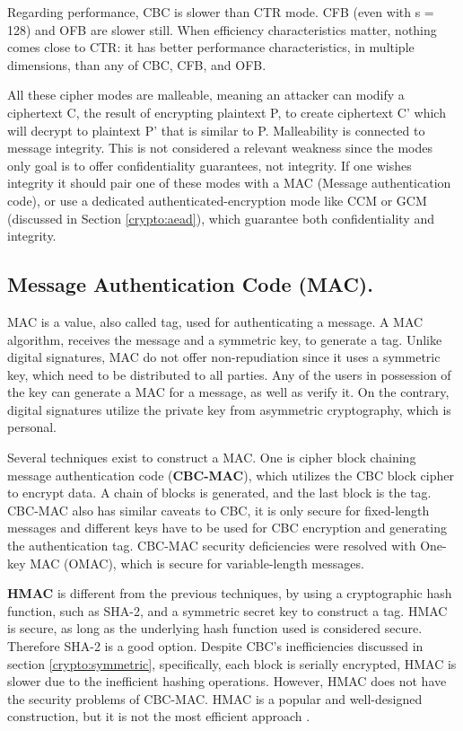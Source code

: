 Regarding performance, CBC is slower than CTR mode. CFB (even with s = 128) and OFB are slower still.
When efficiency characteristics matter, nothing comes close to CTR: it has better performance characteristics, in multiple dimensions, than any of CBC, CFB, and OFB.

All these cipher modes are malleable, meaning an attacker can modify a ciphertext C, the result of encrypting plaintext P, to create ciphertext C' which will decrypt to plaintext P' that is similar to P. Malleability is connected to message integrity. This is not considered a relevant weakness since the modes only goal is to offer confidentiality guarantees, not integrity. If one wishes integrity it should pair one of these modes with a MAC (Message authentication code), or use a dedicated authenticated-encryption mode like CCM or GCM (discussed in Section \ref{crypto:aead}), which guarantee both confidentiality and integrity.

\subsection{Message Authentication Code (MAC).}  \label{crypto:mac}

MAC is a value, also called tag, used for authenticating a message.
A MAC algorithm, receives the message and a symmetric key, to generate a tag. Unlike digital signatures, MAC do not offer non-repudiation since it uses a symmetric key, which need to be distributed to all parties. Any of the users in possession of the key can generate a MAC for a message, as well as verify it. On the contrary, digital signatures utilize the private key from asymmetric cryptography, which is personal.

Several techniques exist to construct a MAC. One is cipher block chaining message authentication code (\textbf{CBC-MAC}), which utilizes the CBC block cipher to encrypt data. A chain of blocks is generated, and the last block is the tag.
CBC-MAC also has similar caveats to CBC, it is only secure for fixed-length messages \cite{aesmodes} and different keys have to be used for CBC encryption and generating the authentication tag. 
CBC-MAC security deficiencies were resolved with One-key MAC (OMAC), which is secure for variable-length messages.

\textbf{HMAC} is different from the previous techniques, by using a cryptographic hash function, such as SHA-2, and a symmetric secret key to construct a tag. HMAC is secure, as long as the underlying hash function used is considered secure. Therefore SHA-2 is a good option.
Despite CBC's inefficiencies discussed in section \ref{crypto:symmetric}, specifically, each block is serially encrypted, HMAC is slower due to the inefficient hashing operations. However, HMAC does not have the security problems of CBC-MAC. HMAC is a popular and well-designed construction, but it is not the most efficient approach \cite{aesmodes}.


